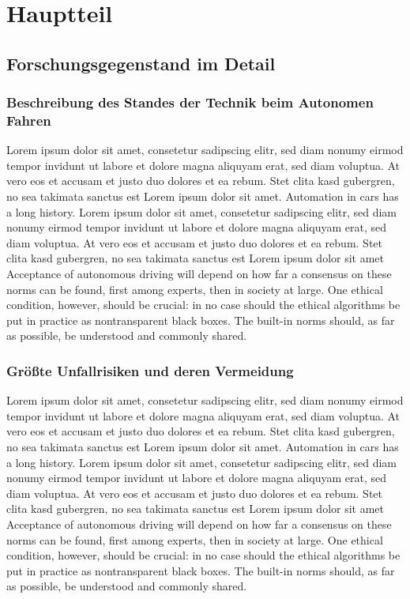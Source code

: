 \chapter{Hauptteil}

\section{Forschungsgegenstand im Detail}
\subsection{Beschreibung des Standes der Technik beim Autonomen Fahren}

Lorem ipsum dolor sit amet, consetetur sadipscing elitr, sed diam nonumy eirmod tempor invidunt ut labore et dolore magna aliquyam erat, sed diam voluptua. 
At vero eos et accusam et justo duo dolores et ea rebum. 
Stet clita kasd gubergren, no sea takimata sanctus est Lorem ipsum dolor sit amet. 
Automation in cars has a long history.  Lorem ipsum dolor sit amet, consetetur sadipscing elitr, sed diam nonumy eirmod tempor invidunt ut labore et dolore magna aliquyam erat, sed diam voluptua. 
At vero eos et accusam et justo duo dolores et ea rebum. 
Stet clita kasd gubergren, no sea takimata sanctus est Lorem ipsum dolor sit amet Acceptance of autonomous driving will depend on how far a consensus on these norms can be found, first among experts, then in society at large. 
One ethical condition, however, should be crucial: in no case should the ethical algorithms be put in practice as nontransparent black boxes. 
The built-in norms should, as far as possible, be understood and commonly shared.

\subsection{Größte Unfallrisiken und deren Vermeidung}

Lorem ipsum dolor sit amet, consetetur sadipscing elitr, sed diam nonumy eirmod tempor invidunt ut labore et dolore magna aliquyam erat, sed diam voluptua. 
At vero eos et accusam et justo duo dolores et ea rebum. 
Stet clita kasd gubergren, no sea takimata sanctus est Lorem ipsum dolor sit amet. 
Automation in cars has a long history.  Lorem ipsum dolor sit amet, consetetur sadipscing elitr, sed diam nonumy eirmod tempor invidunt ut labore et dolore magna aliquyam erat, sed diam voluptua. 
At vero eos et accusam et justo duo dolores et ea rebum. 
Stet clita kasd gubergren, no sea takimata sanctus est Lorem ipsum dolor sit amet Acceptance of autonomous driving will depend on how far a consensus on these norms can be found, first among experts, then in society at large. 
One ethical condition, however, should be crucial: in no case should the ethical algorithms be put in practice as nontransparent black boxes. 
The built-in norms should, as far as possible, be understood and commonly shared.


